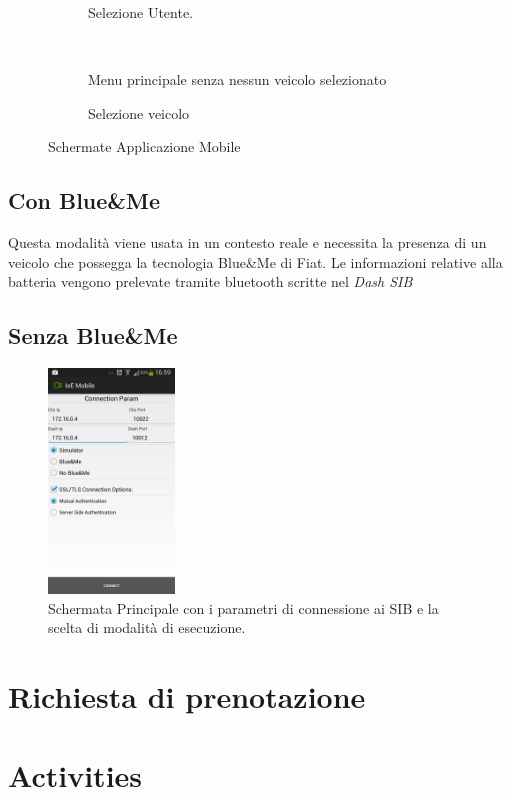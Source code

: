 \begin{figure}[H]
        \centering
        \begin{subfigure}[H]{0.3\textwidth}
                \caption{Selezione Utente.}
                \label{fig:select-user}
        \end{subfigure}%
        ~ %
        \begin{subfigure}[H]{0.3\textwidth}
                \caption{Menu principale senza nessun veicolo selezionato}
                \label{fig:main-menu}
        \end{subfigure}
        \begin{subfigure}[H]{0.3\textwidth}
                \caption{Selezione veicolo}
                \label{fig:select-veh}
        \end{subfigure}
        \caption{Schermate Applicazione Mobile}
\end{figure}

\subsection{Con Blue\&{}Me}

Questa modalità viene usata in un contesto reale e necessita la presenza di un veicolo che possegga la tecnologia Blue\&{}Me di Fiat. Le informazioni relative alla batteria vengono prelevate tramite bluetooth scritte nel \emph{Dash SIB}

\subsection{Senza Blue\&{}Me}


\begin{figure}
	\centering
	\includegraphics[width=0.3\textwidth]{assets/mobile-app-main.png}
	\caption{Schermata Principale con i parametri di connessione ai SIB e la scelta di modalità di esecuzione.}
	\label{fig:main-activity}
\end{figure}


\section{Richiesta di prenotazione}

\section{Activities}
